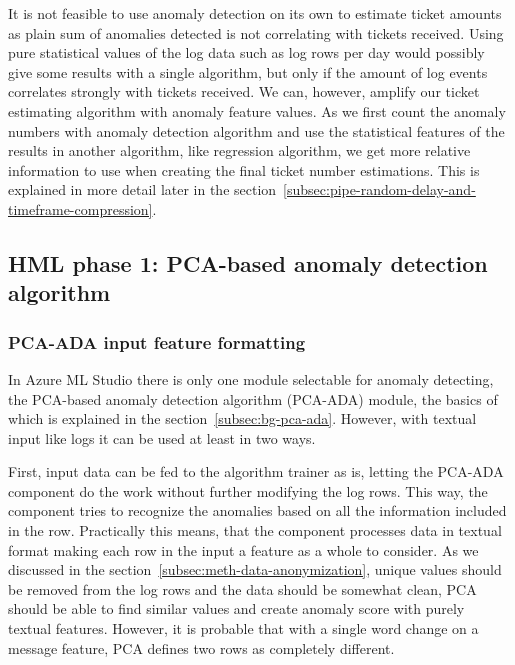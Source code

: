 It is not feasible to use anomaly detection on its own to estimate ticket amounts
as plain sum of anomalies detected
is not correlating with tickets received.
Using pure statistical values of the log data
such as log rows per day
would possibly give some results with a single algorithm,
but only if the amount of log events correlates strongly with tickets received.
We can, however,
amplify our ticket estimating algorithm with anomaly feature values.
As we first count the anomaly numbers with anomaly detection algorithm
and use the statistical features of the results in another algorithm,
like regression algorithm,
we get more relative information to use
when creating the final ticket number estimations.
This is explained in more detail
later in the section~\ref{subsec:pipe-random-delay-and-timeframe-compression}.




\subsection{HML phase 1: PCA-based anomaly detection algorithm}\label{subsec:pipe-pca-ada-input-output}



\subsubsection*{PCA-ADA input feature formatting}
In Azure ML Studio
there is only one module selectable
for anomaly detecting,
the PCA-based anomaly detection algorithm (PCA-ADA) module,
the basics of which is explained in the section~\ref{subsec:bg-pca-ada}.
However,
with textual input like logs
it can be used at least in two ways.

First,
input data can be fed to
the algorithm trainer as is,
letting the PCA-ADA component
do the work without further modifying the log rows.
This way,
the component tries to recognize the anomalies
based on all the information included in the row.
Practically this means,
that the component processes data in textual format
making each row in the input
a feature as a whole to consider.
As we discussed in the section~\ref{subsec:meth-data-anonymization},
unique values should be removed from the log rows
and the data should be somewhat clean,
PCA should be able to find similar values
and create anomaly score with purely textual features.
However,
it is probable that with a single word change on a message feature,
PCA defines two rows as completely different.

